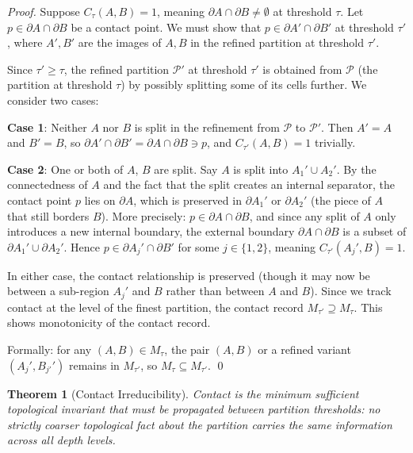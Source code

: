 \documentclass[twocolumn]{article}
\theoremstyle{plain}
\newtheorem{theorem}{Theorem}[section]
\theoremstyle{definition}
\newcommand{\PP}{\mathcal{P}}
\begin{document}
\begin{proof}
Suppose $C_\tau(A,B) = 1$, meaning $\partial A \cap \partial B \neq \emptyset$
at threshold $\tau$. Let $p \in \partial A \cap \partial B$ be a contact point.
We must show that $p \in \partial A' \cap \partial B'$ at threshold $\tau'$,
where $A', B'$ are the images of $A, B$ in the refined partition at threshold
$\tau'$.

Since $\tau' \geq \tau$, the refined partition $\PP'$ at threshold $\tau'$ is
obtained from $\PP$ (the partition at threshold $\tau$) by possibly splitting
some of its cells further. We consider two cases:

\textbf{Case 1}: Neither $A$ nor $B$ is split in the refinement from $\PP$ to
$\PP'$. Then $A' = A$ and $B' = B$, so $\partial A' \cap \partial B' =
\partial A \cap \partial B \ni p$, and $C_{\tau'}(A,B) = 1$ trivially.

\textbf{Case 2}: One or both of $A$, $B$ are split. Say $A$ is split into
$A_1' \cup A_2'$. By the connectedness of $A$ and the fact that the split
creates an internal separator, the contact point $p$ lies on $\partial A$, which
is preserved in $\partial A_1'$ or $\partial A_2'$ (the piece of $A$ that still
borders $B$). More precisely: $p \in \partial A \cap \partial B$, and since any
split of $A$ only introduces a new internal boundary, the external boundary
$\partial A \cap \partial B$ is a subset of $\partial A_1' \cup \partial A_2'$.
Hence $p \in \partial A_j' \cap \partial B'$ for some $j \in \{1,2\}$, meaning
$C_{\tau'}(A_j', B) = 1$.

In either case, the contact relationship is preserved (though it may now be
between a sub-region $A_j'$ and $B$ rather than between $A$ and $B$). Since
we track contact at the level of the finest partition, the contact record
$M_{\tau'} \supseteq M_\tau$. This shows monotonicity of the contact record.

Formally: for any $(A,B) \in M_\tau$, the pair $(A,B)$ or a refined variant
$(A_j', B_{j'}')$ remains in $M_{\tau'}$, so $M_\tau \subseteq M_{\tau'}$. \qed
\end{proof}

\begin{theorem}[Contact Irreducibility]
\label{thm:irreducible}
Contact is the minimum sufficient topological invariant that must be propagated
between partition thresholds: no strictly coarser topological fact about the
partition carries the same information across all depth levels.
\end{theorem}
\end{document}

